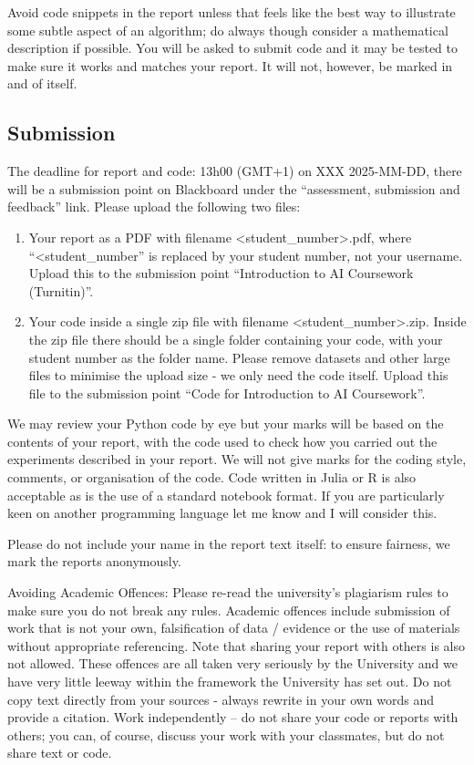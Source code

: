 \documentclass[12pt]{article}
\begin{document}
Avoid code snippets in the report unless that feels like the best way
to illustrate some subtle aspect of an algorithm; do always though
consider a mathematical description if possible. You will be asked to
submit code and it may be tested to make sure it works and matches
your report. It will not, however, be marked in and of itself.

\subsection*{Submission}

The deadline for report and code: 13h00 (GMT+1) on XXX 2025-MM-DD, there
will be a submission point on Blackboard under the ``assessment,
submission and feedback'' link. Please upload the following two files:
\begin{enumerate}
\item Your report as a PDF with filename <student\_number>.pdf, where
  ``<student\_number'' is replaced by your student number, not your
  username. Upload this to the submission point ``Introduction to AI
  Coursework (Turnitin)''.
\item Your code inside a single zip file with filename
  <student\_number>.zip. Inside the zip file there should be a single
  folder containing your code, with your student number as the folder
  name. Please remove datasets and other large files to minimise the
  upload size - we only need the code itself. Upload this file to the
  submission point ``Code for Introduction to AI Coursework''.
\end{enumerate}
  
We may review your Python code by eye but your marks will be based on
the contents of your report, with the code used to check how you
carried out the experiments described in your report. We will not give
marks for the coding style, comments, or organisation of the
code. Code written in Julia or R is also acceptable as is the use of a
standard notebook format. If you are particularly keen on another
programming language let me know and I will consider this.

Please do not include your name in the report text itself: to ensure
fairness, we mark the reports anonymously.

Avoiding Academic Offences: Please re-read the university's plagiarism
rules to make sure you do not break any rules. Academic offences
include submission of work that is not your own, falsification of data
/ evidence or the use of materials without appropriate
referencing. Note that sharing your report with others is also not
allowed. These offences are all taken very seriously by the University
and we have very little leeway within the framework the University has
set out. Do not copy text directly from your sources - always rewrite
in your own words and provide a citation. Work independently -- do not
share your code or reports with others; you can, of course, discuss
your work with your classmates, but do not share text or code.
\end{document}
